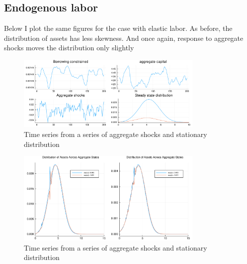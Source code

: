 \documentclass{article} %
\begin{document}
\subsection*{Endogenous labor}
Below I plot the same figures for the case with elastic labor. As before, the distribution of assets has less skewness. And once again, response to aggregate shocks moves the distribution only slightly
\begin{figure}[h!]
  \centering
  \includegraphics[width = 0.8\textwidth]{../endogenous_labor/timeseries.pdf}
    \caption{Time series from a series of aggregate shocks and stationary distribution}
  \end{figure}
\begin{figure}[h!]
  \centering
  \includegraphics[width = 0.8\textwidth]{../endogenous_labor/enddistribution.pdf}
    \caption{Time series from a series of aggregate shocks and stationary distribution}
  \end{figure}
\end{document}

